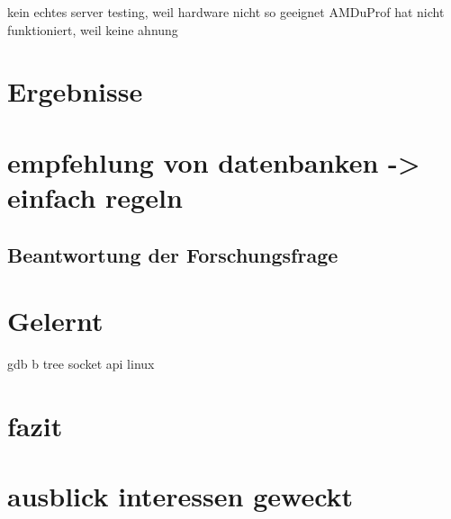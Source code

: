 kein echtes server testing, weil hardware nicht so geeignet
AMDuProf hat nicht funktioniert, weil keine ahnung


\section{Ergebnisse}
\section{empfehlung von datenbanken -> einfach regeln}
\subsection{Beantwortung der Forschungsfrage}
\section{Gelernt}
gdb
b tree
socket api linux

\section{fazit}
\section{ausblick interessen geweckt}

% 
